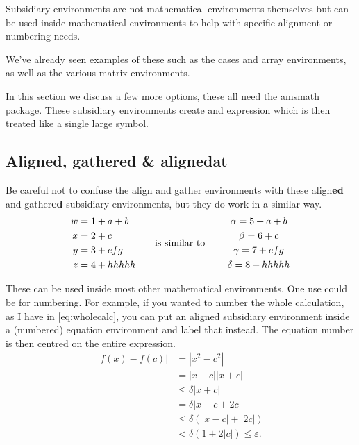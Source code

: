 \documentclass[a4paper,11pt]{article}
\begin{document}
Subsidiary environments are not mathematical environments themselves but can be used inside mathematical environments to help with specific alignment or numbering needs. 

We've already seen  examples of these such as the cases and array environments, as well as the various matrix environments. 

In this section we discuss a few more options, these all need the amsmath package. These subsidiary environments create and expression which is then treated like a single large symbol.  

\subsection{Aligned, gathered \& alignedat}

Be careful not to confuse the align and gather environments with these  align\textbf{ed} and gather\textbf{ed} subsidiary environments, but they do work in a similar way.
\[
	\begin{aligned}
		w &= 1 + a+b \\
		x &= 2 + c\\
		y &= 3 + efg \\
		z &= 4 + hhhhh
	\end{aligned}
\text{\qquad is similar to \qquad}
	\begin{gathered}
		\alpha 	= 5 + a+b \\
		\beta 	= 6 + c\\
		\gamma 	= 7 + efg \\
		\delta 	= 8 + hhhhh
	\end{gathered} 
\]

These can be used inside most other mathematical environments. One use could be for numbering. For example, if you  wanted to number the whole calculation, as I have in \eqref{eq:wholecalc}, you can put an aligned  subsidiary environment inside a (numbered) equation environment and label that instead. The equation number is then centred on the entire expression. 
\begin{equation}\label{eq:wholecalc}
\begin{aligned} 
|f(x)-f(c)| & =    |x^2-c^2| \\                
            & =    |x-c||x+c|     \\           
            & \leq \delta |x+c|    \\                  
            & =    \delta |x-c+2c| \\
            & \leq \delta \left( |x-c|+|2c|\right)  \\  
            & <    \delta \left( 1+2|c|\right ) \leq \varepsilon.                      
\end{aligned}
\end{equation} 
\end{document}
